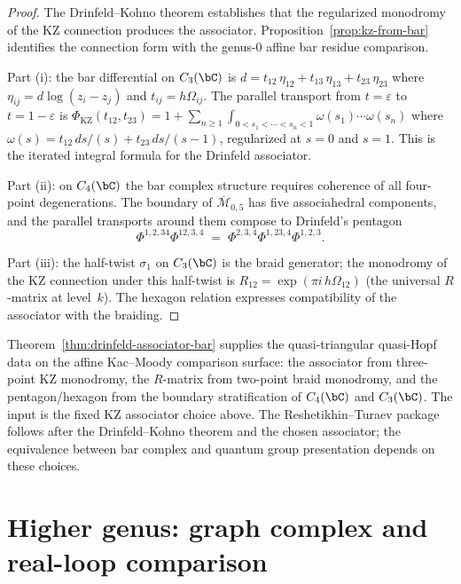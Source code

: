 \begin{proof}
The Drinfeld--Kohno theorem \cite{Drinfeld90,Kohno87} establishes that the
regularized monodromy of the KZ connection produces the associator.
Proposition~\ref{prop:kz-from-bar} identifies the connection form with the
genus-$0$ affine bar residue comparison.

Part (i): the bar differential on $C_3(\bC)$ is
$d = t_{12}\, \eta_{12} + t_{13}\, \eta_{13} + t_{23}\, \eta_{23}$ where
$\eta_{ij} = d\log(z_i - z_j)$ and $t_{ij}=h\Omega_{ij}$. The parallel
transport from $t = \varepsilon$ to $t = 1 - \varepsilon$ is
$\Phi_{\mathrm{KZ}}(t_{12}, t_{23})
= 1 + \sum_{n \geq 1} \int_{0<s_1<\cdots<s_n<1}
\omega(s_1) \cdots \omega(s_n)$
where $\omega(s) = t_{12}\, ds/(s) + t_{23}\, ds/(s-1)$, regularized at
$s = 0$ and $s = 1$. This is the iterated integral formula for the Drinfeld
associator.

Part (ii): on $C_4(\bC)$ the bar complex structure requires coherence of all
four-point degenerations. The boundary of $\overline{\mathcal{M}}_{0,5}$ has
five associahedral components, and the parallel transports around them compose
to Drinfeld's pentagon
\[
\Phi^{1,2,34}\Phi^{12,3,4}
\;=\;
\Phi^{2,3,4}\Phi^{1,23,4}\Phi^{1,2,3}.
\]

Part (iii): the half-twist $\sigma_1$ on $C_3(\bC)$ is the braid generator;
the monodromy of the KZ connection under this half-twist is
$R_{12}=\exp(\pi i\,h\Omega_{12})$ (the universal $R$-matrix at level~$k$). The
hexagon relation expresses compatibility of the associator with the braiding.
\end{proof}

\begin{remark}
\label{rem:bar-quasi-triangular}
Theorem~\ref{thm:drinfeld-associator-bar} supplies the quasi-triangular
quasi-Hopf data on the affine Kac--Moody comparison surface: the associator
from three-point KZ monodromy, the $R$-matrix from two-point braid monodromy,
and the pentagon/hexagon from the boundary stratification of $C_4(\bC)$ and
$C_3(\bC)$. The input is the fixed KZ associator choice above. The
Reshetikhin--Turaev package follows after the Drinfeld--Kohno theorem and the
chosen associator; the equivalence between bar complex and quantum group
presentation depends on these choices.
\end{remark}


\section{Higher genus: graph complex and real-loop comparison}
\label{sec:bar-to-loop}

